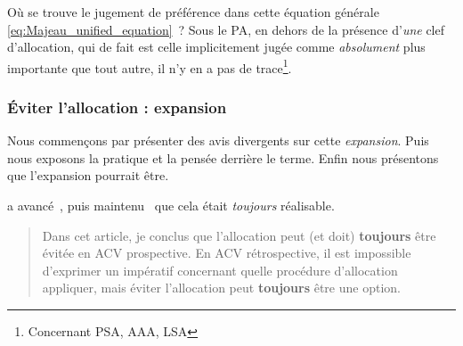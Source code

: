 Où se trouve le jugement de préférence dans cette équation générale \eqref{eq:Majeau_unified_equation}~?
Sous le PA, en dehors de la présence d'\emph{une} clef d'allocation, qui de fait est celle implicitement jugée comme \emph{absolument} plus importante que tout autre, il n'y en a pas de trace\footnote{Concernant PSA, AAA, LSA}.
\subsubsection{Éviter l'allocation : expansion}
Nous commençons par présenter des avis divergents sur cette \textit{expansion}.
Puis nous exposons la pratique et la pensée derrière le terme.
Enfin nous présentons que l’expansion pourrait être.

\citeauthor{weidema_avoiding_2000} a avancé~\cite{weidema_avoiding_2000}, puis maintenu~\cite{weidema_avoiding_2010} que cela était \emph{toujours} réalisable.
\blockcquote[traduction]{weidema_avoiding_2000}{
Dans cet article, je conclus que l'allocation peut (et doit) \textbf{toujours} être évitée en ACV prospective. En ACV rétrospective, il est impossible d'exprimer un impératif concernant quelle procédure d'allocation appliquer, mais éviter l'allocation peut \textbf{toujours} être une option.
}

